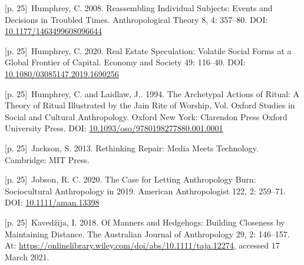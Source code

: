 \documentclass[10pt,a4paper]{article}
\begin{document}
\noindent\begin{minipage}[t]{\linewidth}{\scriptsize\color{gray} [p. 25]}\ Humphrey, C. 2008. Reassembling Individual Subjects: Events and Decisions in Troubled Times. Anthropological Theory 8, 4: 357–80. DOI: \url{10.1177/1463499608096644}\par\end{minipage}\par
\noindent\begin{minipage}[t]{\linewidth}{\scriptsize\color{gray} [p. 25]}\ Humphrey, C. 2020. Real Estate Speculation: Volatile Social Forms at a Global Frontier of Capital. Economy and Society 49: 116–40. DOI: \url{10.1080/03085147.2019.1690256}\par\end{minipage}\par
\noindent\begin{minipage}[t]{\linewidth}{\scriptsize\color{gray} [p. 25]}\ Humphrey, C. and Laidlaw, J.. 1994. The Archetypal Actions of Ritual: A Theory of Ritual Illustrated by the Jain Rite of Worship, Vol. Oxford Studies in Social and Cultural Anthropology. Oxford New York: Clarendon Press Oxford University Press. DOI: \url{10.1093/oso/9780198277880.001.0001}\par\end{minipage}\par
\noindent\begin{minipage}[t]{\linewidth}{\scriptsize\color{gray} [p. 25]}\ Jackson, S. 2013. Rethinking Repair: Media Meets Technology. Cambridge: MIT Press.\par\end{minipage}\par
\noindent\begin{minipage}[t]{\linewidth}{\scriptsize\color{gray} [p. 25]}\ Jobson, R. C. 2020. The Case for Letting Anthropology Burn: Sociocultural Anthropology in 2019. American Anthropologist 122, 2: 259–71. DOI: \url{10.1111/aman.13398}\par\end{minipage}\par
\noindent\begin{minipage}[t]{\linewidth}{\scriptsize\color{gray} [p. 25]}\ Kavedžija, I. 2018. Of Manners and Hedgehogs: Building Closeness by Maintaining Distance. The Australian Journal of Anthropology 29, 2: 146–157. At: \url{https://onlinelibrary.wiley.com/doi/abs/10.1111/taja.12274,} accessed 17 March 2021.\par\end{minipage}\par
\end{document}
